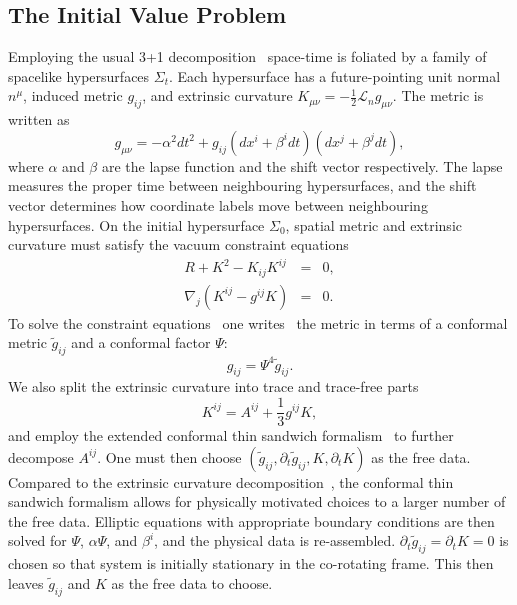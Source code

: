 \subsection{The Initial Value Problem}
\label{subsec:IVP}
Employing the usual 3+1 decomposition~\cite{ADM,york79} space-time is foliated by a family
of spacelike hypersurfaces $\Sigma_t$. Each hypersurface has a
future-pointing unit normal $n^{\mu}$, induced metric $g_{ij}$, and
extrinsic curvature
$K_{\mu\nu}=-\frac{1}{2}\mathcal{L}_{n}g_{\mu\nu}$. The metric is
written as 
\begin{equation}
g_{\mu\nu}=-\alpha^2dt^2+g_{ij}\left(dx^i+\beta^idt\right)\left(dx^j+\beta^jdt\right),
\end{equation}
where $\alpha$ and $\beta$ are the lapse function and the shift vector
respectively. The lapse measures the proper time between neighbouring
hypersurfaces, and the shift vector determines how coordinate labels
move between neighbouring hypersurfaces.  On the initial
hypersurface $\Sigma_0$, spatial metric and extrinsic curvature must satisfy the vacuum
constraint equations
\begin{eqnarray}
R+K^2-K_{ij}K^{ij}&=&0, \\
\nabla_j\left(K^{ij}-g^{ij}K\right)&=&0.
\end{eqnarray}
To solve the constraint equations \ one writes~\cite{Lichnerowicz44}
the metric in terms of a conformal metric $\tilde{g}_{ij}$ and a
conformal factor $\Psi$:
\begin{equation}
g_{ij}=\Psi^4\tilde{g}_{ij}.
\end{equation}
We also split the extrinsic curvature into trace and trace-free parts
\begin{equation}
K^{ij}=A^{ij}+\frac{1}{3}g^{ij}K,
\end{equation}
and employ the extended conformal thin sandwich formalism~\cite{York1999,Pfeiffer2003b} to further
decompose $A^{ij}$.  One must then choose
$\left(\tilde{g}_{ij},\partial_{t}\tilde{g}_{ij},K,\partial_{t}K\right)$
as the free data.  Compared to the extrinsic curvature decomposition~\cite{Murchadha-York:1974b}, the conformal thin sandwich formalism allows for 
physically motivated choices to a larger number of the free data.  Elliptic equations
with appropriate boundary conditions are then solved for $\Psi$,
$\alpha\Psi$, and $\beta^i$, and the physical data is
re-assembled. $\partial_t\tilde{g}_{ij} = \partial_tK = 0$ is chosen
so that system is initially stationary in the co-rotating
frame.  This then leaves $\tilde{g}_{ij}$ and $K$ as the free data to
choose.  

